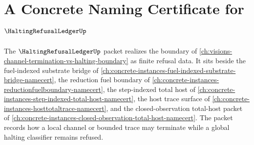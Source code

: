 \chapter{A Concrete Naming Certificate for $\HaltingRefusalLedgerUp$}
\label{ch:concrete-instances-halting-refusal-ledger-namecert}

The $\HaltingRefusalLedgerUp$ packet realizes the boundary of \autoref{ch:visions-channel-termination-vs-halting-boundary} as finite refusal data. It sits beside the fuel-indexed substrate bridge of \autoref{ch:concrete-instances-fuel-indexed-substrate-bridge-namecert}, the reduction fuel boundary of \autoref{ch:concrete-instances-reductionfuelboundary-namecert}, the step-indexed total host of \autoref{ch:concrete-instances-step-indexed-total-host-namecert}, the host trace surface of \autoref{ch:concrete-instances-hosttotaltrace-namecert}, and the closed-observation total-host packet of \autoref{ch:concrete-instances-closed-observation-total-host-namecert}. The packet records how a local channel or bounded trace may terminate while a global halting classifier remains refused.



